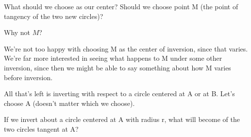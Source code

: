 What should we choose as our center?  Should we choose point M (the point of tangency of the two new circles)?



Why not $M$?







We're not too happy with choosing M as the center of inversion, since that varies.  We're far more interested in seeing what happens to M under some other inversion, since then we might be able to say something about how M varies before inversion.

All that's left is inverting with respect to a circle centered at A or at B.  Let's choose A (doesn't matter which we choose).

If we invert about a circle centered at A with radius r, what will become of the two circles tangent at A?






